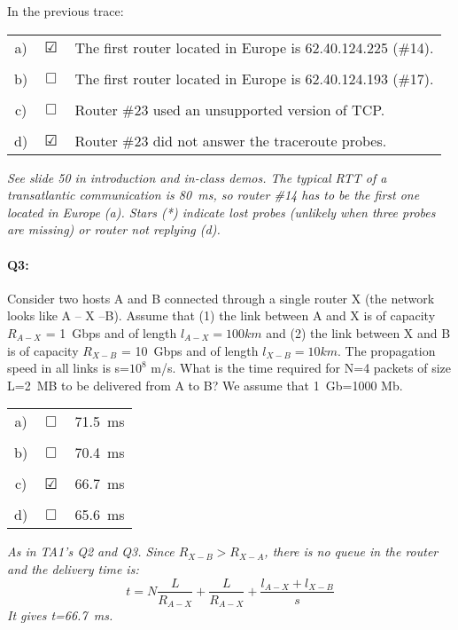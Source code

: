 \documentclass{llncs}
\newcommand{\answer}[1]{{\color{red}\textit{#1}\color{black}}}
\begin{document}
\newpage
In the previous trace:

\begin{tabular}{ccl}
  a) & $\CheckedBox$ & The first router located in Europe is 62.40.124.225 (\#14).\\
  \\
  b) & $\Box$ & The first router located in Europe is 62.40.124.193 (\#17).\\
  \\
  c) & $\Box$ & Router \#23 used an unsupported version of TCP.\\
  \\
  d) & $\CheckedBox$ & Router \#23 did not answer the traceroute probes.
\end{tabular}

\answer{See slide 50 in introduction and in-class demos. The typical
  RTT of a transatlantic communication is 80~ms, so router \#14 has to
  be the first one located in Europe (a). Stars (*) indicate lost
  probes (unlikely when three probes are missing) or router not
  replying (d).}

\paragraph{\textbf{Q3:}}
Consider two hosts A and B connected through a single router X (the
network looks like A -- X --B). Assume that (1) the link between A and
X is of capacity $R_{A-X}$ = 1~Gbps and of length $l_{A-X}=100 km$
and (2) the link between X and B is of capacity $R_{X-B}$ = 10~Gbps
and of length $l_{X-B}=10km$. The propagation speed in all links is
s=$10^8$ m/s. What is the time required for N=4 packets of size L=2~MB
to be delivered from A to B?  We assume that 1~Gb=1000 Mb.

\begin{tabular}{ccl}
  a) & $\Box$ & 71.5~ms\\
  \\
  b) & $\Box$ & 70.4~ms\\
  \\
  c) & $\CheckedBox$ & 66.7~ms \\
  \\
  d) & $\Box$ & 65.6~ms
\end{tabular}

\answer{As in TA1's Q2 and Q3. Since $R_{X-B}>R_{X-A}$, there is
  no queue in the router and the delivery time is:
  \begin{equation*}
    t=N\frac{L}{R_{A-X}}+\frac{L}{R_{A-X}}+\frac{l_{A-X}+l_{X-B}}{s}
  \end{equation*}
  It gives t=66.7~ms.
}
\end{document}
